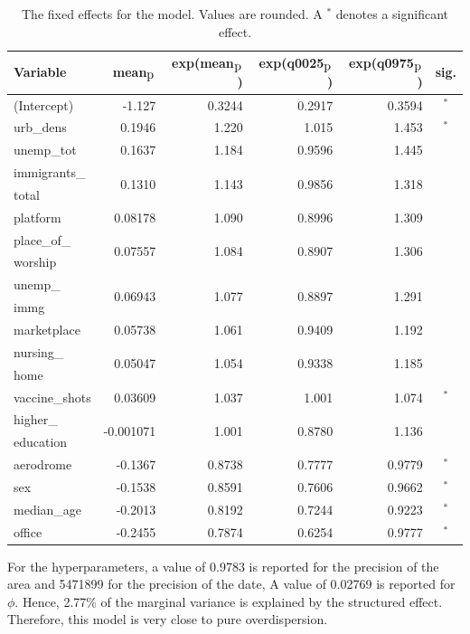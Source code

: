 \begin{table}[H]
\caption{The fixed effects for the model. Values are rounded. A $^*$ denotes a significant effect. \label{fixedAllNorway_temporal}}
\begin{tabular}{l r r r r c}
\toprule
\textbf{Variable}	& \textbf{mean$_{\hbox{p}}$}	& \textbf{exp(mean$_{\hbox{p}}$)} & \textbf{exp(q0025$_{\hbox{p}}$)} & \textbf{exp(q0975$_{\hbox{p}}$)} & \textbf{sig.}\\
\midrule
(Intercept) & -1.127 & 0.3244 & 0.2917 & 0.3594 & $^*$ \\
urb\_dens & 0.1946 & 1.220 & 1.015 & 1.453 & $^*$ \\
unemp\_tot & 0.1637 & 1.184 & 0.9596 & 1.445 \\
immigrants\_ & \multirow{2}{*}{0.1310}& \multirow{2}{*}{1.143}& \multirow{2}{*}{0.9856}& \multirow{2}{*}{1.318}& \multirow{2}{*}{}\\
total \\
platform & 0.08178 & 1.090 & 0.8996 & 1.309 \\
place\_of\_ & \multirow{2}{*}{0.07557}& \multirow{2}{*}{1.084}& \multirow{2}{*}{0.8907}& \multirow{2}{*}{1.306} \\
worship \\
unemp\_ & \multirow{2}{*}{0.06943} & \multirow{2}{*}{1.077} & \multirow{2}{*}{0.8897} & \multirow{2}{*}{1.291} & \multirow{2}{*}{} \\
immg\\
marketplace & 0.05738 & 1.061 & 0.9409 & 1.192 \\
nursing\_ & \multirow{2}{*}{0.05047} & \multirow{2}{*}{1.054} & \multirow{2}{*}{0.9338} & \multirow{2}{*}{1.185} \\
home\\
vaccine\_shots & 0.03609 & 1.037 & 1.001 & 1.074 & $^*$\\
higher\_ & \multirow{2}{*}{-0.001071}& \multirow{2}{*}{1.001}& \multirow{2}{*}{0.8780}& \multirow{2}{*}{1.136}\\ 
education \\
aerodrome & -0.1367 & 0.8738 & 0.7777 & 0.9779 & $^*$ \\
sex & -0.1538 & 0.8591 & 0.7606 & 0.9662 & $^*$ \\
median\_age & -0.2013 & 0.8192 & 0.7244 & 0.9223 &$^*$ \\
office & -0.2455 & 0.7874 & 0.6254 & 0.9777 & $^*$ \\
\bottomrule
\end{tabular}
\end{table}
For the hyperparameters, a value of 0.9783 is reported for the precision of the area and 5471899 for the precision of the date, A value of 0.02769 is reported for $\phi$. Hence, 2.77\% of the marginal variance is explained by the structured effect. Therefore, this model is very close to pure overdispersion.
